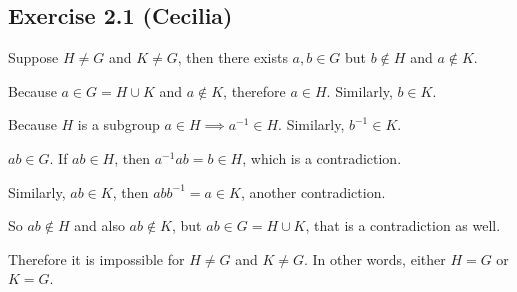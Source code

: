 \subsection*{Exercise 2.1 (Cecilia)}

Suppose $ H \ne G $ and $ K \ne G $, then there exists $ a,b \in G $ but $ b \notin H $ and $ a \notin K $. 

Because $ a \in G = H \cup K $ and $ a \notin K $, therefore $ a \in H $. Similarly, $ b \in K $.

Because $ H $ is a subgroup $ a \in H \implies a^{-1} \in H $. Similarly, $ b^{-1} \in K $.

$ ab \in G $. If $ ab \in H $, then $ a^{-1} ab = b \in H $, which is a contradiction.

Similarly, $ ab \in K $, then $ abb^{-1} = a \in K $, another contradiction.

So $ ab \notin H $ and also $ ab \notin K $, but $ ab \in G = H \cup K $, that is a contradiction as well.

Therefore it is impossible for $ H \ne G $ and $ K \ne G $. In other words, either $ H = G $ or $ K = G $.
